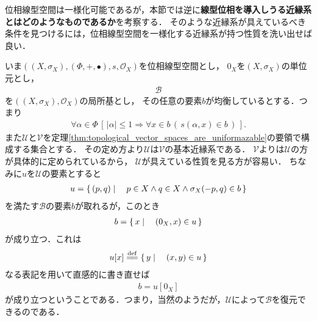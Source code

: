 	位相線型空間は一様化可能であるが，本節では逆に{\bf 線型位相を導入しうる近縁系とはどのようなものであるか}を考察する．
	そのような近縁系が具えているべき条件を見つけるには，位相線型空間を一様化する近縁系が持つ性質を洗い出せば良い．
	
	いま$\left(\left(X,\sigma_X\right),(\Phi,+,\bullet),s,\mathscr{O}_X\right)$を位相線型空間とし，
	$0_X$を$\left(X,\sigma_X\right)$の単位元とし，
	\begin{align}
		\mathscr{B}
	\end{align}
	を$\left(\left(X,\sigma_X\right),\mathscr{O}_X\right)$の局所基とし，
	その任意の要素$b$が均衡しているとする．つまり
	\begin{align}
		\forall \alpha \in \Phi\,
		\left[\, |\alpha| \leq 1 \Longrightarrow \forall x \in b\, \left(\, s(\alpha,x) \in b\, \right)\, \right].
	\end{align}
	また$\mathscr{U}$と$\mathscr{V}$を定理\ref{thm:topological_vector_spaces_are_uniformazable}の要領で構成する集合とする．
	その定め方より$\mathscr{U}$は$\mathscr{V}$の基本近縁系である．
	$\mathscr{V}$よりは$\mathscr{U}$の方が具体的に定められているから，
	$\mathscr{U}$が具えている性質を見る方が容易い．
	ちなみに$u$を$\mathscr{U}$の要素とすると
	\begin{align}
		u = \left\{\, (p,q) \mid \quad p \in X \wedge q \in X \wedge \sigma_X(-p,q) \in b\, \right\}
	\end{align}
	を満たす$\mathscr{B}$の要素$b$が取れるが，このとき
	\begin{align}
		b = \left\{\, x \mid \quad \left(0_X,x\right) \in u\, \right\}
	\end{align}
	が成り立つ．これは
	\begin{align}
		u[x] \defeq \Set{y}{(x,y) \in u}
	\end{align}
	なる表記を用いて直感的に書き直せば
	\begin{align}
		b = u[0_X]
	\end{align}
	が成り立つということである．つまり，当然のようだが，$\mathscr{U}$によって$\mathscr{B}$を復元できるのである．
	
